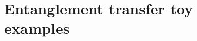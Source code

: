 \documentclass[
	aps, pra,
	superscriptaddress, twocolumn,
	floatfix,
	10pt
]{revtex4-1}
\newcommand{\parTitle}[1]{\noindent{\color{Mahogany}(\emph{#1})}}
\newcommand{\calH}{{\mathcal{H}}}
\newcommand{\calS}{{\mathcal{S}}}
\begin{document}

\section{Entanglement transfer toy examples}
\end{document}
